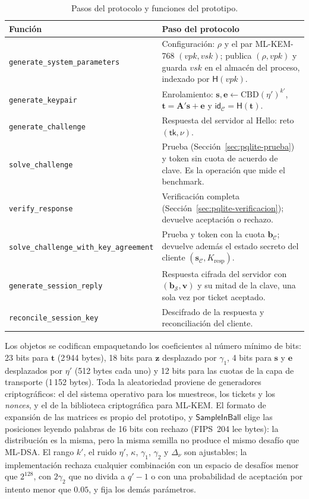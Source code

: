 \begin{table}[H]
\centering
\caption{Pasos del protocolo y funciones del prototipo.}
\label{tab:pqlite_codigo}
\small
\begin{tabularx}{\textwidth}{lY}
\toprule
\textbf{Función} & \textbf{Paso del protocolo} \\
\midrule
\texttt{generate\_system\_parameters} & Configuración: $\rho$ y el par ML-KEM-768 $(vpk, vsk)$; publica $(\rho, vpk)$ y guarda $vsk$ en el almacén del proceso, indexado por $\mathsf{H}(vpk)$. \\
\texttt{generate\_keypair} & Enrolamiento: $\mathbf{s}, \mathbf{e} \leftarrow \mathrm{CBD}(\eta')^{k'}$, $\mathbf{t} = \mathbf{A}'\mathbf{s} + \mathbf{e}$ y $\mathsf{id}_{\mathcal{C}} = \mathsf{H}(\mathbf{t})$. \\
\texttt{generate\_challenge} & Respuesta del servidor al \textsf{Hello}: reto $(\mathsf{tk}, \nu)$. \\
\texttt{solve\_challenge} & Prueba (Sección~\ref{sec:pqlite-prueba}) y token sin cuota de acuerdo de clave. Es la operación que mide el benchmark. \\
\texttt{verify\_response} & Verificación completa (Sección~\ref{sec:pqlite-verificacion}); devuelve aceptación o rechazo. \\
\texttt{solve\_challenge\_with\_key\_agreement} & Prueba y token con la cuota $\mathbf{b}_{\mathcal{C}}$; devuelve además el estado secreto del cliente $(\mathbf{s}_{\mathcal{C}}, K_{\text{resp}})$. \\
\texttt{generate\_session\_reply} & Respuesta cifrada del servidor con $(\mathbf{b}_{\mathcal{S}}, \mathbf{v})$ y su mitad de la clave, una sola vez por ticket aceptado. \\
\texttt{reconcile\_session\_key} & Descifrado de la respuesta y reconciliación del cliente. \\
\bottomrule
\end{tabularx}
\end{table}

Los objetos se codifican empaquetando los coeficientes al número mínimo de bits: 23 bits para $\mathbf{t}$ (2\,944 bytes), 18 bits para $\mathbf{z}$ desplazado por $\gamma_1$, 4 bits para $\mathbf{s}$ y $\mathbf{e}$ desplazados por $\eta'$ (512 bytes cada uno) y 12 bits para las cuotas de la capa de transporte (1\,152 bytes). Toda la aleatoriedad proviene de generadores criptográficos: el del sistema operativo para los muestreos, los tickets y los \textit{nonces}, y el de la biblioteca criptográfica para ML-KEM. El formato de expansión de las matrices es propio del prototipo, y $\mathsf{SampleInBall}$ elige las posiciones leyendo palabras de 16 bits con rechazo (FIPS~204 lee bytes): la distribución es la misma, pero la misma semilla no produce el mismo desafío que ML-DSA. El rango $k'$, el ruido $\eta'$, $\kappa$, $\gamma_1$, $\gamma_2$ y $\Delta_\nu$ son ajustables; la implementación rechaza cualquier combinación con un espacio de desafíos menor que $2^{128}$, con $2\gamma_2$ que no divida a $q'-1$ o con una probabilidad de aceptación por intento menor que $0.05$, y fija los demás parámetros.
